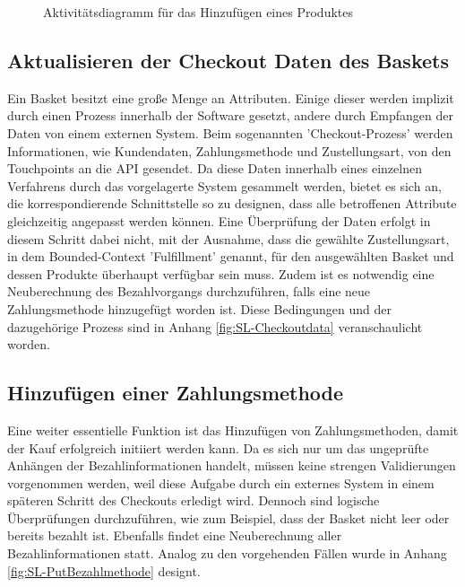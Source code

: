 \begin{figure}[h!]
	\centering
	
	\caption{Aktivitätsdiagramm für das Hinzufügen eines Produktes }
	\label{fig:SL-AddProduct}
\end{figure}

\subsection{Aktualisieren der Checkout Daten des Baskets}

Ein Basket besitzt eine große Menge an Attributen. Einige dieser werden implizit durch einen Prozess innerhalb der Software gesetzt, andere durch Empfangen der Daten von einem externen System. Beim sogenannten 'Checkout-Prozess' werden Informationen, wie Kundendaten, Zahlungsmethode und Zustellungsart, von den Touchpoints an die API gesendet. Da diese Daten innerhalb eines einzelnen Verfahrens durch das vorgelagerte System gesammelt werden, bietet es sich an, die korrespondierende Schnittstelle so zu designen, dass alle betroffenen Attribute gleichzeitig angepasst werden können. Eine Überprüfung der Daten erfolgt in diesem Schritt dabei nicht, mit der Ausnahme, dass die gewählte Zustellungsart, in dem Bounded-Context 'Fulfillment' genannt, für den ausgewählten Basket und dessen Produkte überhaupt verfügbar sein muss. Zudem ist es notwendig eine Neuberechnung des Bezahlvorgangs durchzuführen, falls eine neue Zahlungsmethode hinzugefügt worden ist. Diese Bedingungen und der dazugehörige Prozess sind in Anhang \ref{fig:SL-Checkoutdata} veranschaulicht worden.


\subsection{Hinzufügen einer Zahlungsmethode}

Eine weiter essentielle Funktion ist das Hinzufügen von Zahlungsmethoden, damit der Kauf erfolgreich initiiert werden kann. Da es sich nur um das ungeprüfte Anhängen der Bezahlinformationen handelt, müssen keine strengen Validierungen vorgenommen werden, weil diese Aufgabe durch ein externes System in einem späteren Schritt des Checkouts erledigt wird. Dennoch sind logische Überprüfungen durchzuführen, wie zum Beispiel, dass der Basket nicht leer oder bereits bezahlt ist. Ebenfalls findet eine Neuberechnung aller Bezahlinformationen statt. Analog zu den vorgehenden Fällen wurde in Anhang \ref{fig:SL-PutBezahlmethode} designt.

